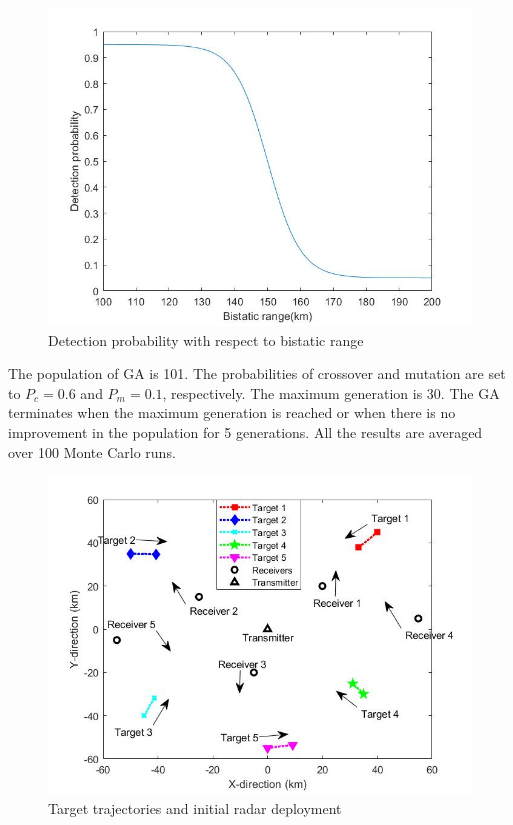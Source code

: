\documentclass[12pt,journal,draftclsnofoot,onecolumn]{IEEEtran}
\begin{document}
\begin{figure}
	\centering
	\includegraphics[scale=0.36]{Pd.jpg}
	\caption{Detection probability with respect to bistatic range}
	\label{fig:pd}
\end{figure}

The population of GA is 101. The probabilities of crossover and mutation are set to $P_c=0.6$ and $P_m=0.1$, respectively. The maximum generation is 30. The GA terminates when the maximum generation is reached or when there is no improvement in the population for 5 generations. All the results are averaged over 100 Monte Carlo runs.

\begin{figure}
	\centering
	\includegraphics[scale=0.36]{Initial State.jpg}
	\caption{Target trajectories and initial radar deployment}
	\label{fig:pd}
\end{figure}
\end{document}
